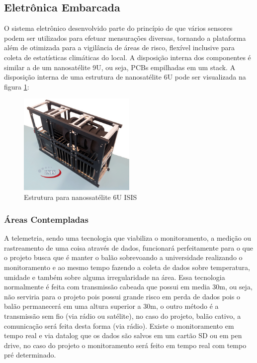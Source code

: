 \subsection{Eletrônica Embarcada}

O sistema eletrônico desenvolvido parte do princípio de que vários sensores podem ser utilizados para efetuar mensurações diversas, tornando a plataforma além de otimizada para a vigilância de áreas de risco, flexível inclusive para  coleta de estatísticas climáticas do local. A disposição interna dos componentes é similar a de um nanosatélite 9U, ou seja, PCBs empilhadas em um stack. A disposição interna de uma estrutura de nanosatélite 6U pode ser visualizada na figura \ref{img:nanosatelite}:

	\begin{figure}[H]
		\centering
		\includegraphics[width=0.5\textwidth]{figuras/nano}
		\caption{Estrutura para nanossatélite 6U ISIS }
		\label{img:nanosatelite}
	\end{figure}

\subsubsection{Áreas Contempladas} %
\label{sub:_reas_contempladas}


	A telemetria, sendo uma tecnologia que viabiliza o monitoramento, a medição ou rastreamento de uma coisa através de dados, funcionará perfeitamente para o que o projeto busca que é manter o balão sobrevoando a universidade realizando o monitoramento e ao mesmo tempo fazendo a coleta de dados sobre temperatura, umidade e também sobre alguma irregularidade na área. Essa tecnologia normalmente é feita com transmissão cabeada que possui em media 30m, ou seja, não serviria para o projeto pois possui grande risco em perda de dados pois o balão permanecerá em uma altura superior a 30m, o outro método é a transmissão sem fio (via rádio ou satélite), no caso do projeto, balão cativo, a comunicação será feita desta forma (via rádio). Existe o monitoramento em tempo real e via datalog que os dados são salvos em um cartão SD ou em pen drive, no caso do projeto o monitoramento será feito em tempo real com tempo pré determinado.

